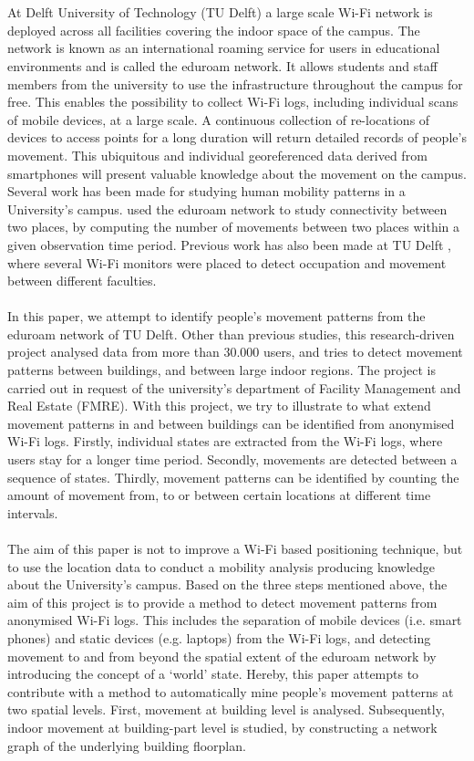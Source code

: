 \\\\
At Delft University of Technology (TU Delft) a large scale Wi-Fi network is deployed across all facilities covering the indoor space of the campus. The network is known as an international roaming service for users in educational environments and is called the eduroam network. It allows students and staff members from the university to use the infrastructure throughout the campus for free. This enables the possibility to collect Wi-Fi logs, including individual scans of mobile devices, at a large scale.  A continuous collection of re-locations of devices to access points for a long duration will return detailed records of people’s movement. This ubiquitous and individual georeferenced data derived from smartphones will present valuable knowledge about the movement on the campus. 
Several work has been made for studying human mobility patterns in a University’s campus.   \cite{meneses2012large} used the eduroam network to study connectivity between two places, by computing the number of movements between two places within a given observation time period. Previous work has also been made at TU Delft \cite{spek2015rhythm}, where several Wi-Fi monitors were placed to detect occupation and movement between different faculties. 
\\\\
In this paper, we attempt to identify people’s movement patterns from the eduroam network of TU Delft. Other than previous studies, this research-driven project analysed data from more than 30.000 users, and tries to detect movement patterns between buildings, and between large indoor regions. The project is carried out in request of the university’s department of Facility Management and Real Estate (FMRE). With this project, we try to illustrate to what extend movement patterns in and between buildings can be identified from anonymised Wi-Fi logs. Firstly, individual states are extracted from the Wi-Fi logs, where users stay for a longer time period. Secondly, movements are detected between a sequence of states. Thirdly, movement patterns can be identified by counting the amount of movement from, to or between certain locations at different time intervals. 
\\\\
The aim of this paper is not to improve a Wi-Fi based positioning technique, but to use the location data to conduct a mobility analysis producing knowledge about the University’s campus. Based on the three steps mentioned above, the aim of this project is to provide a method to detect movement patterns from anonymised Wi-Fi logs. This includes the separation of mobile devices (i.e. smart phones) and static devices (e.g. laptops) from the Wi-Fi logs, and detecting movement to and from beyond the spatial extent of the eduroam network by introducing the concept of a ‘world’ state. Hereby, this paper attempts to contribute with a method to automatically mine people’s movement patterns at two spatial levels. First, movement at building level is analysed. Subsequently, indoor movement at building-part level is studied, by constructing a network graph of the underlying building floorplan. 
